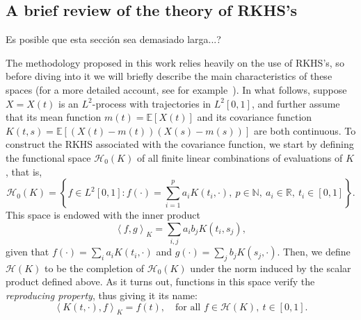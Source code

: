 \documentclass[ba]{imsart}
\numberwithin{equation}{section}
\theoremstyle{plain}
\newcommand{\N}{\mathbb{N}}
\newcommand{\R}{\mathbb{R}}
\newcommand\dotprod[2]{\left\langle #1, #2 \right\rangle}
\newenvironment{comment}
{
\noindent \em \color{red}
}
{
\color{black}
}
\begin{document}
\subsection{A brief review of the theory of RKHS's}\label{sec:rkhs}

\begin{comment}
  Es posible que esta sección sea demasiado larga...?
\end{comment}

The methodology proposed in this work relies heavily on the use of RKHS's, so before diving into it we will briefly describe the main characteristics of these spaces (for a more detailed account, see for example~\citet{berlinet2004reproducing}). In what follows, suppose \(X=X(t)\) is an \(L^2\)-process with trajectories in \(L^2[0,1]\), and further assume that its mean function \(m(t)=\mathbb E[X(t)]\) and its covariance function \(K(t, s)= \mathbb E[(X(t) - m(t))(X(s) - m(s))]\) are both continuous. To construct the RKHS associated with the covariance function, we start by defining the functional space \(\mathcal H_0(K)\) of all finite linear combinations of evaluations of \(K\), that is,
\[
\mathcal H_0(K) = \left\{ f \in L^2[0,1]: f(\cdot) = \sum_{i=1}^p a_i K(t_i, \cdot), \ p \in \N, \ a_i \in \R, \ t_i \in [0, 1] \right\}.
\]
This space is endowed with the inner product
\[
\dotprod{f}{g}_K = \sum_{i, j} a_i b_j K(t_i, s_j),
\]
given that \(f(\cdot)=\sum_i a_i K(t_i, \cdot) \) and \(g(\cdot)=\sum_j b_j K(s_j, \cdot)\). Then, we define \(\mathcal H(K)\) to be the completion of \(\mathcal H_0(K)\) under the norm induced by the scalar product defined above. As it turns out, functions in this space verify the \textit{reproducing property}, thus giving it its name:
\begin{equation}\label{eq:reproducing-property}
  \dotprod{K(t, \cdot)}{f}_K = f(t), \quad \text{for all } f \in \mathcal H(K), \ t \in [0, 1].
\end{equation}
\end{document}
